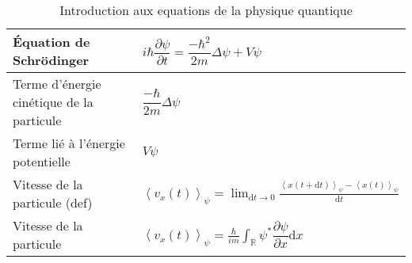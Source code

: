 \documentclass[10pt,a4paper,titlepage,landscape]{article}
\renewcommand{\d}
{
    \mathrm{d}
}
\newcommand*{\dpv}[2]
{
    \dfrac{\partial#1}{\partial#2}
}
\newcommand{\av}[2]
{
    \left\langle#1\right\rangle_{#2}
}
\newcommand{\lap}[1]
{
    \Delta#1
}
\newcommand{\rint}
{
    \int_{\mathbb{R}}
}
\begin{document}
\begin{table}[H]
\begin{tabular}{@{}|p{9cm}|p{10cm}@{}|}
        Équation de Schrödinger & $i\hbar \dpv{\psi}{t} = \dfrac{-\hbar ^2}{2m}\Delta \psi+V\psi$ \\ \hline
        Terme d'énergie cinétique de la particule & $\dfrac{-\hbar}{2m}\lap{\psi}$ \\ \hline
        Terme lié à l'énergie potentielle & $V\psi$ \\ \hline
        Vitesse de la particule (def) & $\av{v_x(t)}{\psi} = \displaystyle\lim_{\d t \to0} \frac{\av{x(t+\d t)}{\psi} - \av{x(t)}{\psi}}{\d t}$ \\ \hline
        Vitesse de la particule & $\displaystyle \av{v_x(t)}{\psi} = \frac{\hbar}{im}\rint \psi^* \dpv{\psi}{x}\d x$ \\ \hline
        \end{tabular}
\caption{Introduction aux equations de la physique quantique}
\label{tab:quantphis}
\end{table}
\end{document}
